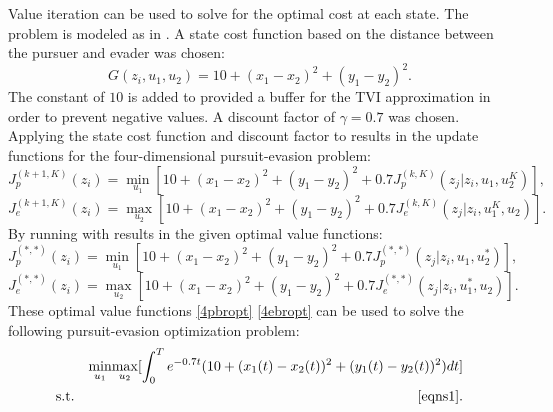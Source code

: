 Value iteration can be used to solve for the optimal cost at each state. The problem is modeled as in . A state cost function based on the distance between the pursuer and evader was chosen: 
\begin{equation}\label{4cost}
G(z_i,u_1,u_2)= 10+(x_1-x_2)^2+(y_1-y_2)^2.
\end{equation}
The constant of $10$ is added to provided a buffer for the TVI approximation in order to prevent negative values. A discount factor of $\gamma = 0.7$ was chosen. Applying the state cost function and discount factor to  results in the update functions for the four-dimensional pursuit-evasion problem:
\begin{equation}\label{4pbell}
J_p^{(k+1,K)}(z_i)= \underset{u_1 }{\operatorname{min }}[10+(x_1-x_2)^2+(y_1-y_2)^2+0.7 J_p^{(k,K)}(z_j|z_i,u_1,u_2^K)],
\end{equation}
\begin{equation}\label{4ebell}
J_e^{(k+1,K)}(z_i)= \underset{u_2 }{\operatorname{max }}[10+(x_1-x_2)^2+(y_1-y_2)^2+0.7 J_e^{(k,K)}(z_j|z_i,u_1^K,u_2)].
\end{equation} 
By running  with  results in the given optimal value functions:
\begin{equation}\label{4pbropt}
J_p^{(*,*)}(z_i)= \underset{u_1 }{\operatorname{min }}[10+(x_1-x_2)^2+(y_1-y_2)^2+0.7 J_p^{(*,*)}(z_j|z_i,u_1,u_2^*)],
\end{equation}
\begin{equation}\label{4ebropt}
J_e^{(*,*)}(z_i)= \underset{u_2 }{\operatorname{max }}[10+(x_1-x_2)^2+(y_1-y_2)^2+0.7 J_e^{(*,*)}(z_j|z_i,u_1^*,u_2)].
\end{equation}    
These optimal value functions \ref{4pbropt} \ref{4ebropt} can be used to solve the following pursuit-evasion optimization problem:
\begin{eqnarray}\label{4opt}
&&\underset{u_1 }{\operatorname{min }}\underset{u_2 }{\operatorname{max }}[\int_{0}^{T}e^{-0.7t}(10+(x_1(t)-x_2(t))^2+(y_1(t)-y_2(t))^2)dt]\\
&\textnormal{s.t.}&\ref{eqns1}.
\end{eqnarray}

